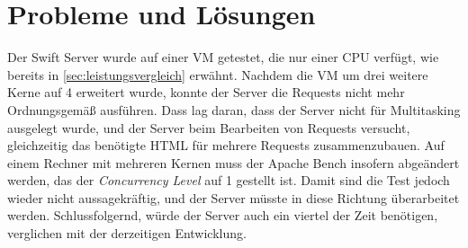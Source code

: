 \section{Probleme und Lösungen}
Der Swift Server wurde auf einer VM getestet, die nur einer CPU verfügt, wie bereits in \ref{sec:leistungsvergleich} erwähnt. Nachdem die VM um drei weitere Kerne auf 4 erweitert wurde, konnte der Server die Requests nicht mehr Ordnungsgemäß ausführen. Dass lag daran, dass der Server nicht für Multitasking ausgelegt wurde, und der Server beim Bearbeiten von Requests versucht, gleichzeitig das benötigte HTML für mehrere Requests zusammenzubauen. Auf einem Rechner mit mehreren Kernen muss der Apache Bench insofern abgeändert werden, das der \textit{Concurrency Level} auf 1 gestellt ist. Damit sind die Test jedoch wieder nicht aussagekräftig, und der Server müsste in diese Richtung überarbeitet werden. Schlussfolgernd, würde der Server auch ein viertel der Zeit benötigen, verglichen mit der derzeitigen Entwicklung.

\chapterend

